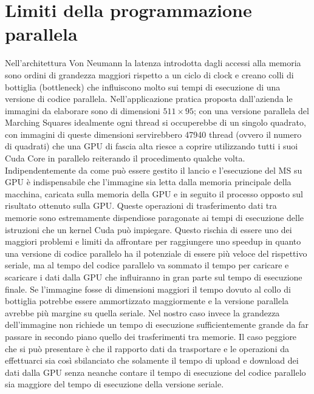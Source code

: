 \documentclass[12pt,a4paper]{report}
\begin{document}
\newpage
\section{Limiti della programmazione parallela}
Nell'architettura Von Neumann la latenza introdotta dagli accessi alla memoria sono ordini di grandezza maggiori rispetto a un ciclo di clock e creano colli di bottiglia (bottleneck) che influiscono molto sui tempi di esecuzione di una versione di codice parallela.
Nell'applicazione pratica proposta dall'azienda le immagini da elaborare sono di dimensioni $511\times 95$; con una versione parallela del Marching Squares idealmente ogni thread si occuperebbe di un singolo quadrato, con immagini di queste dimensioni servirebbero 47940 thread (ovvero il numero di quadrati) che una GPU di fascia alta riesce a coprire utilizzando tutti i suoi Cuda Core in parallelo reiterando il procedimento qualche volta. \newline
Indipendentemente da come può essere gestito il lancio e l'esecuzione del MS su GPU è indispensabile che l'immagine sia letta dalla memoria principale della macchina, caricata sulla memoria della GPU e in seguito il processo opposto sul risultato ottenuto sulla GPU.
Queste operazioni di trasferimento dati tra memorie sono estremamente dispendiose paragonate ai tempi di esecuzione delle istruzioni che un kernel Cuda può impiegare.
Questo rischia di essere uno dei maggiori problemi e limiti da affrontare per raggiungere uno speedup in quanto una versione di codice parallelo ha il potenziale di essere più veloce del rispettivo seriale, ma al tempo del codice parallelo va sommato il tempo per caricare e scaricare i dati dalla GPU che influiranno in gran parte sul tempo di esecuzione finale. \newline
Se l'immagine fosse di dimensioni maggiori il tempo dovuto al collo di bottiglia potrebbe essere ammortizzato maggiormente e la versione parallela avrebbe più margine su quella seriale. Nel nostro caso invece la grandezza dell'immagine non richiede un tempo di esecuzione sufficientemente grande da far passare in secondo piano quello dei trasferimenti tra memorie. \newline
Il caso peggiore che si può presentare è che il rapporto dati da trasportare e le operazioni da effettuarci sia così sbilanciato che solamente il tempo di upload e download dei dati dalla GPU senza neanche contare il tempo di esecuzione del codice parallelo sia maggiore del tempo di esecuzione della versione seriale.
\newpage
\end{document}
